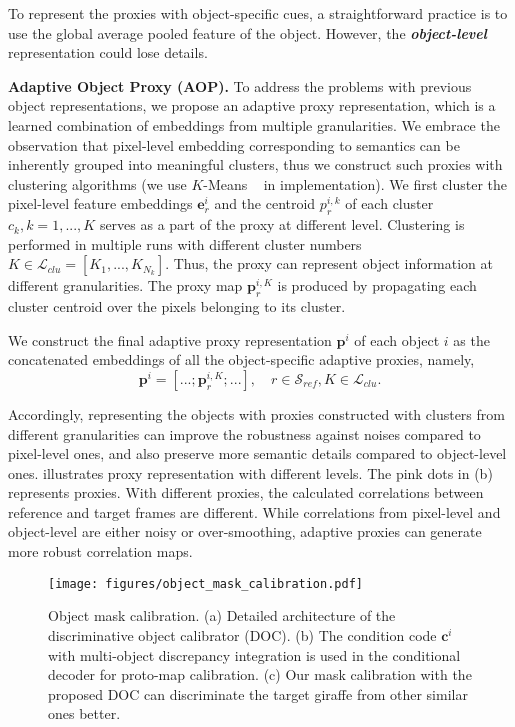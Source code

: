 \documentclass[sigconf]{acmart}
\begin{document}
 
To represent the proxies with object-specific cues, a straightforward practice is to use the global average pooled feature of the object. However, the \textbf{\textit{object-level}} representation could lose details.

\noindent\textbf{Adaptive Object Proxy (AOP).}
\label{sec:adaptove_proxy_representation}
To address the problems with previous object representations, we propose an adaptive proxy representation, which is a learned combination of embeddings from multiple granularities. 
We embrace the observation that pixel-level embedding corresponding to semantics can be inherently grouped into meaningful clusters, thus we construct such proxies with clustering algorithms (we use $K$-Means ~\cite{likas2003global} in implementation).
We first cluster the pixel-level feature embeddings $\mathbf{e}_r^i$ and the centroid $p_r^{i,k}$ of each cluster $c_k, k=1,...,K$ serves as a part of the proxy at different level.
Clustering is performed in multiple runs with different cluster numbers $K \in \mathcal{L}_{clu}=[K_1,..., K_{N_k}]$. Thus, the proxy can represent object information at different granularities. The proxy map $\mathbf{p}_r^{i,K}$ is produced by propagating each cluster centroid over the pixels belonging to its cluster.

We construct the final adaptive proxy representation $\mathbf{p}^{i}$ of each object $i$ as the concatenated embeddings of all the object-specific adaptive proxies, namely,
\begin{equation}
    \mathbf{p}^i = [...; \mathbf{p}_{r}^{i,K}; ...], \quad r \in \mathcal{S}_{ref}, K \in \mathcal{L}_{clu}.
\end{equation}

Accordingly, representing the objects with proxies constructed with clusters from different granularities can improve the robustness against noises compared to pixel-level ones, and also preserve more semantic details compared to object-level ones.
\fig{\ref{fig:object_representation}} illustrates proxy representation with different levels. The pink dots in \fig{\ref{fig:object_representation}} (b) represents proxies. With different proxies, the calculated correlations between reference and target frames are different. While correlations from pixel-level and object-level are either noisy or over-smoothing, adaptive proxies can generate more robust correlation maps.

\begin{figure}[t]
	\centering
	\texttt{[image: figures/object\_mask\_calibration.pdf]}
\caption{Object mask calibration. (a) Detailed architecture of the discriminative object calibrator (DOC). (b) The condition code $\mathbf{c}^i$ with multi-object discrepancy integration is used in the conditional decoder for proto-map calibration. (c) Our mask calibration with the proposed DOC can discriminate the target giraffe from other similar ones better. }
\label{fig:multi-object-discrimination}
\end{figure} 
\end{document}
